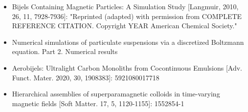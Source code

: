 \begin{itemize}
    {COMPLETE REFERENCE CITATION}. Copyright {YEAR} American Chemical Society."
    \item Bijels Containing Magnetic Particles: A Simulation Study [Langmuir, 2010, 26, 11, 7928-7936]: 
    "Reprinted (adapted) with permission from {COMPLETE REFERENCE CITATION}. Copyright {YEAR} 
    American Chemical Society."
    \item Numerical simulations of particulate suspensions via a discretized Boltzmann equation. Part 2. Numerical results
    \item Aerobijels: Ultralight Carbon Monoliths from Cocontinuous Emulsions 
    [Adv. Funct. Mater. 2020, 30, 1908383]: 5921080017718
    \item Hierarchical assemblies of superparamagnetic colloids in 
    time-varying magnetic fields [Soft Matter. 17, 5, 1120-1155]: 1552854-1
\end{itemize}